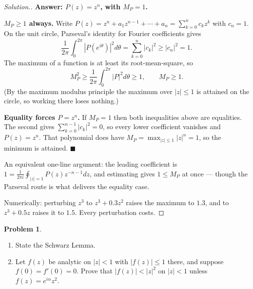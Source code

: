 \documentclass[11pt,a4paper]{article}
\theoremstyle{definition}
\newtheorem{problemx}{Problem}[section]
\newenvironment{problem}{\begin{problemx}}{\end{problemx}}
\newenvironment{solution}
  {\renewcommand{\qedsymbol}{}\begin{proof}[\textit{Solution}.]}
  {\end{proof}}
\begin{document}
\begin{solution}
\textbf{Answer: $P(z) = z^{n}$, with $M_P = 1$.}

\textbf{$M_P \geq 1$ always.} Write
$P(z) = z^{n} + a_1z^{n-1} + \cdots + a_n = \sum^{n}_{k=0}c_k z^{k}$ with
$c_n = 1$. On the unit circle, Parseval's identity for Fourier coefficients gives
$$\frac{1}{2\pi}\int^{2\pi}_{0}\left|P\!\left(e^{i\theta}\right)\right|^{2}d\theta
= \sum^{n}_{k=0}\left|c_k\right|^{2} \geq \left|c_n\right|^{2} = 1 .$$
The maximum of a function is at least its root-mean-square, so
$$M_P^{2} \geq \frac{1}{2\pi}\int^{2\pi}_{0}\left|P\right|^{2}d\theta \geq 1,
\qquad M_P \geq 1 .$$
(By the maximum modulus principle the maximum over $\left|z\right| \leq 1$ is
attained on the circle, so working there loses nothing.)

\textbf{Equality forces $P = z^{n}$.} If $M_P = 1$ then both inequalities above are
equalities. The second gives $\sum^{n-1}_{k=0}\left|c_k\right|^{2} = 0$, so every
lower coefficient vanishes and $P(z) = z^{n}$. That polynomial does have
$M_P = \max_{\left|z\right|\leq1}\left|z\right|^{n} = 1$, so the minimum is
attained. $\blacksquare$

An equivalent one-line argument: the leading coefficient is
$1 = \frac{1}{2\pi i}\oint_{\left|z\right|=1} P(z)z^{-n-1}dz$, and estimating gives
$1 \leq M_P$ at once --- though the Parseval route is what delivers the equality case.

Numerically: perturbing $z^{3}$ to $z^{3}+0.3z^{2}$ raises the maximum to $1.3$,
and to $z^{3}+0.5z$ raises it to $1.5$. Every perturbation costs.
\end{solution}


\begin{problem}
\begin{enumerate}
\item[(a).] State the Schwarz Lemma.
\item[(b).] Let $f(z)$ be analytic on $\left|z\right| < 1$ with
$\left|f(z)\right| \leq 1$ there, and suppose $f(0) = f'(0) = 0$. Prove that
$\left|f(z)\right| < \left|z\right|^{2}$ on $\left|z\right| < 1$ unless
$f(z) = e^{i\alpha}z^{2}$.
\end{enumerate}
\end{problem}
\end{document}
